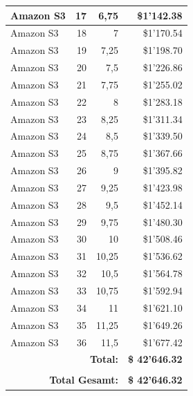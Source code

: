 \begin{table}
\begin{center}
\begin{tabular}{|l|r|r|r|}
Amazon S3 & 17 & 6,75 & \$1'142.38 \\ \hline
Amazon S3 & 18 & 7 & \$1'170.54 \\ \hline
Amazon S3 & 19 & 7,25 & \$1'198.70 \\ \hline
Amazon S3 & 20 & 7,5 & \$1'226.86 \\ \hline
Amazon S3 & 21 & 7,75 & \$1'255.02 \\ \hline
Amazon S3 & 22 & 8 & \$1'283.18 \\ \hline
Amazon S3 & 23 & 8,25 & \$1'311.34 \\ \hline
Amazon S3 & 24 & 8,5 & \$1'339.50 \\ \hline
Amazon S3 & 25 & 8,75 & \$1'367.66 \\ \hline
Amazon S3 & 26 & 9 & \$1'395.82 \\ \hline
Amazon S3 & 27 & 9,25 & \$1'423.98 \\ \hline
Amazon S3 & 28 & 9,5 & \$1'452.14 \\ \hline
Amazon S3 & 29 & 9,75 & \$1'480.30 \\ \hline
Amazon S3 & 30 & 10 & \$1'508.46 \\ \hline
Amazon S3 & 31 & 10,25 & \$1'536.62 \\ \hline
Amazon S3 & 32 & 10,5 & \$1'564.78 \\ \hline
Amazon S3 & 33 & 10,75 & \$1'592.94 \\ \hline
Amazon S3 & 34 & 11 & \$1'621.10 \\ \hline
Amazon S3 & 35 & 11,25 & \$1'649.26 \\ \hline
Amazon S3 & 36 & 11,5 & \$1'677.42 \\ \hline
\multicolumn{3}{r|}{\textbf{Total:}} & \textbf{\$ 42'646.32} \\ \cline{4-4}
\multicolumn{4}{c}{} \\ \cline{4-4}
\multicolumn{3}{r|}{\textbf{Total Gesamt:}} & \textbf{ \$ 42'646.32} \\ \cline{4-4}
\end{tabular}
\end{center}
\label{tab:KostenAmazonS3S1}
\end{table}

